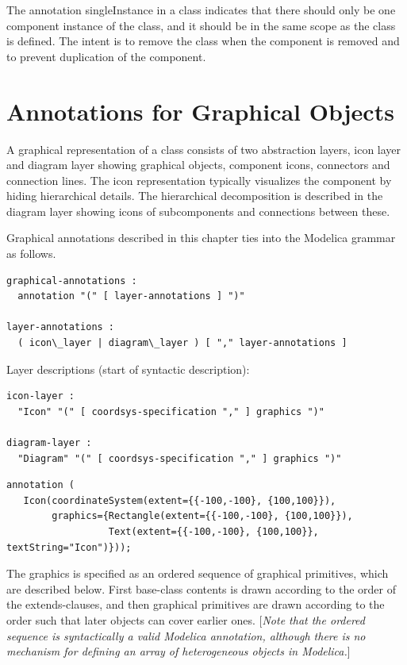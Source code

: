 The annotation singleInstance in a class indicates that there should
only be one component instance of the class, and it should be in the
same scope as the class is defined. The intent is to remove the class
when the component is removed and to prevent duplication of the
component.

\section{Annotations for Graphical Objects}

A graphical representation of a class consists of two abstraction
layers, icon layer and diagram layer showing graphical objects,
component icons, connectors and connection lines. The icon
representation typically visualizes the component by hiding hierarchical
details. The hierarchical decomposition is described in the diagram
layer showing icons of subcomponents and connections between these.

Graphical annotations described in this chapter ties into the Modelica
grammar as follows.
\begin{lstlisting}[language=grammar]
graphical-annotations :
  annotation "(" [ layer-annotations ] ")"

layer-annotations :
  ( icon\_layer | diagram\_layer ) [ "," layer-annotations ]
\end{lstlisting}
Layer descriptions (start of syntactic description):
\begin{lstlisting}[language=grammar]
icon-layer :
  "Icon" "(" [ coordsys-specification "," ] graphics ")"

diagram-layer :
  "Diagram" "(" [ coordsys-specification "," ] graphics ")"
\end{lstlisting}

\begin{example}
\begin{lstlisting}[language=modelica]
annotation (
   Icon(coordinateSystem(extent={{-100,-100}, {100,100}}),
        graphics={Rectangle(extent={{-100,-100}, {100,100}}),
                  Text(extent={{-100,-100}, {100,100}}, textString="Icon")}));
\end{lstlisting}
\end{example}

The graphics is specified as an ordered sequence of graphical
primitives, which are described below. First base-class contents is
drawn according to the order of the extends-clauses, and then graphical
primitives are drawn according to the order such that later objects can
cover earlier ones. {[}\emph{Note that the ordered sequence is
syntactically a valid Modelica annotation, although there is no
mechanism for defining an array of heterogeneous objects in
Modelica.}{]}

